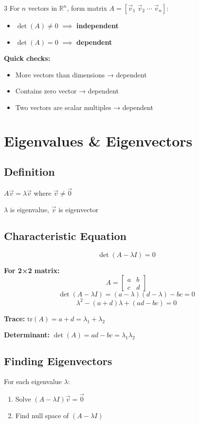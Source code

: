 \documentclass[10pt,landscape]{article}
\begin{document}
\begin{multicols*}{3}
For $n$ vectors in $\mathbb{R}^n$, form matrix $A = [\vec{v}_1 \; \vec{v}_2 \; \cdots \; \vec{v}_n]$:
\begin{itemize}
    \item $\det(A) \neq 0$ $\implies$ \textbf{independent}
    \item $\det(A) = 0$ $\implies$ \textbf{dependent}
\end{itemize}

\textbf{Quick checks:}
\begin{itemize}
    \item More vectors than dimensions → dependent
    \item Contains zero vector → dependent
    \item Two vectors are scalar multiples → dependent
\end{itemize}

\columnbreak

\section*{Eigenvalues \& Eigenvectors}

\subsection*{Definition}
$A\vec{v} = \lambda\vec{v}$ where $\vec{v} \neq \vec{0}$

$\lambda$ is eigenvalue, $\vec{v}$ is eigenvector

\subsection*{Characteristic Equation}
$$\det(A - \lambda I) = 0$$

\textbf{For 2×2 matrix:}
$$A = \begin{bmatrix} a & b \\ c & d \end{bmatrix}$$
$$\det(A - \lambda I) = (a-\lambda)(d-\lambda) - bc = 0$$
$$\lambda^2 - (a+d)\lambda + (ad-bc) = 0$$

\textbf{Trace:} $\text{tr}(A) = a + d = \lambda_1 + \lambda_2$

\textbf{Determinant:} $\det(A) = ad - bc = \lambda_1 \lambda_2$

\subsection*{Finding Eigenvectors}
For each eigenvalue $\lambda$:
\begin{enumerate}
    \item Solve $(A - \lambda I)\vec{v} = \vec{0}$
    \item Find null space of $(A - \lambda I)$
\end{enumerate}


\end{multicols*}
\end{document}
